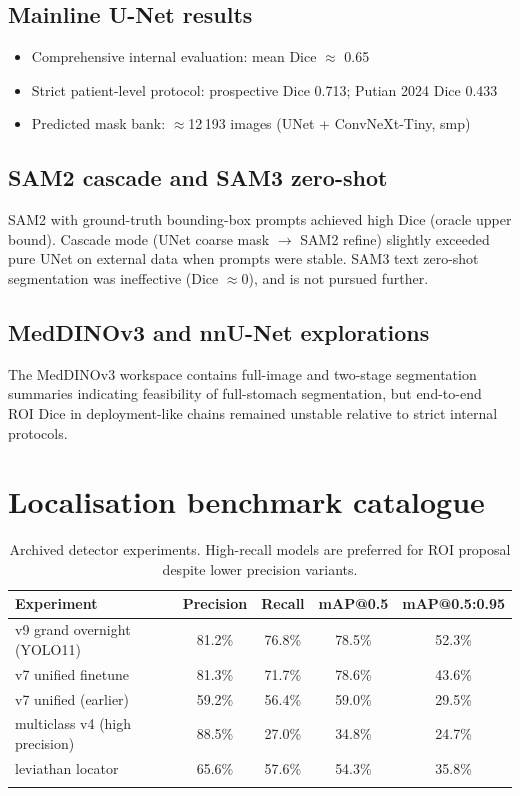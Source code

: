 \documentclass[11pt,a4paper]{article}
\begin{document}
\subsection{Mainline U-Net results}
\begin{itemize}
  \item Comprehensive internal evaluation: mean Dice $\approx$ 0.65
  \item Strict patient-level protocol: prospective Dice 0.713; Putian 2024 Dice 0.433
  \item Predicted mask bank: $\approx$12\,193 images (UNet + ConvNeXt-Tiny, smp)
\end{itemize}

\subsection{SAM2 cascade and SAM3 zero-shot}
SAM2 with ground-truth bounding-box prompts achieved high Dice (oracle upper bound). Cascade mode (UNet coarse mask $\rightarrow$ SAM2 refine) slightly exceeded pure UNet on external data when prompts were stable. SAM3 text zero-shot segmentation was ineffective (Dice $\approx$0), and is not pursued further.

\subsection{MedDINOv3 and nnU-Net explorations}
The MedDINOv3 workspace contains full-image and two-stage segmentation summaries indicating feasibility of full-stomach segmentation, but end-to-end ROI Dice in deployment-like chains remained unstable relative to strict internal protocols.

\section{Localisation benchmark catalogue}
\begin{longtable}{lcccc}
\toprule
Experiment & Precision & Recall & mAP@0.5 & mAP@0.5:0.95 \\
\midrule
\endhead
v9 grand overnight (YOLO11) & 81.2\% & 76.8\% & 78.5\% & 52.3\% \\
v7 unified finetune & 81.3\% & 71.7\% & 78.6\% & 43.6\% \\
v7 unified (earlier) & 59.2\% & 56.4\% & 59.0\% & 29.5\% \\
multiclass v4 (high precision) & 88.5\% & 27.0\% & 34.8\% & 24.7\% \\
leviathan locator & 65.6\% & 57.6\% & 54.3\% & 35.8\% \\
\bottomrule
\caption{Archived detector experiments. High-recall models are preferred for ROI proposal despite lower precision variants.}
\end{longtable}
\end{document}
